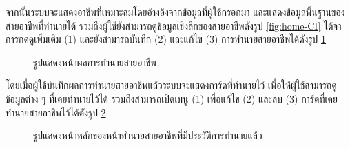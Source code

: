 จากนั้นระบบจะแสดงอาชีพที่เหมาะสมโดยอ้างอิงจากข้อมูลที่ผู้ใช้กรอกมา และแสดงข้อมูลพื้นฐานของสายอาชีพที่ทำนายได้ รวมถึงผู้ใช้ยังสามารถดูข้อมูลเชิงลึกของสายอาชีพดังรูป \ref{fig:home-CI} ได้จาการกดดูเพิ่มเติม (1) และยังสามารถบันทึก (2) และแก้ไข (3) การทำนายสายอาชีพได้ดังรูป \ref{fig:viewmore-CP} 
\begin{figure}[H]\centering
    \caption{รูปแสดงหน้าผลการทำนายสายอาชีพ}\label{fig:viewmore-CP}
\end{figure}
โดยเมื่อผู้ใช้บันทึกผลการทำนายสายอาชีพแล้วระบบจะแสดงการ์ดที่ทำนายไว้ เพื่อให้ผู้ใช้สามารถดูข้อมูลต่าง ๆ ที่เคยทำนายไว้ได้ รวมถึงสามารถเปิดเมนู (1) เพื่อแก้ไข (2) และลบ (3) การ์ดที่เคยทำนายสายอาชีพไว้ได้ดังรูป \ref{fig:cardhistory-CP} 
\begin{figure}[H]\centering
    \caption{รูปแสดงหน้าหลักของหน้าทำนายสายอาชีพที่มีประวัติการทำนายแล้ว}\label{fig:cardhistory-CP}
\end{figure}
